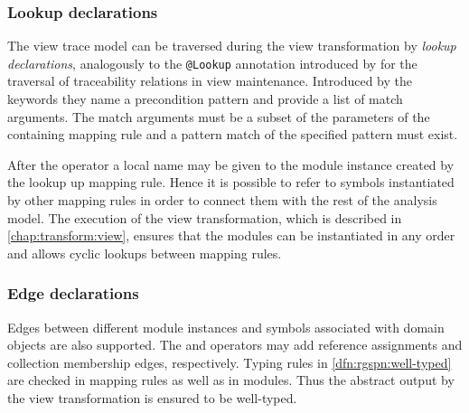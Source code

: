 \subsubsection{Lookup declarations}

The view trace model can be traversed during the view transformation by \emph{lookup declarations}, analogously to the \texttt{@Lookup} annotation introduced by \citet{Debreceni14viewmodel} for the traversal of traceability relations in view maintenance. Introduced by the keywords  they name a precondition pattern and provide a list of match arguments. The match arguments must be a subset of the parameters of the containing mapping rule and a pattern match of the specified pattern must exist.

After the operator  a local name may be given to the module instance created by the lookup up mapping rule. Hence it is possible to refer to symbols instantiated by other mapping rules in order to connect them with the rest of the analysis model. The execution of the view transformation, which is described in \vref{chap:transform:view}, ensures that the modules can be instantiated in any order and allows cyclic lookups between mapping rules.

\subsubsection{Edge declarations}

Edges between different  module instances and symbols associated with domain objects are also supported. The \lit{:=} and \lit{+=} operators may add reference assignments and collection membership edges, respectively. Typing rules in \vref{dfn:rgspn:well-typed} are checked in mapping rules as well as in  modules. Thus the abstract  output by the view transformation is ensured to be well-typed.

